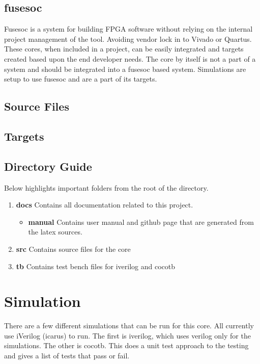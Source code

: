 \subsection{fusesoc}
\par
Fusesoc is a system for building FPGA software without relying on the internal project management of the tool. Avoiding vendor lock in to Vivado or Quartus.
These cores, when included in a project, can be easily integrated and targets created based upon the end developer needs. The core by itself is not a part of
a system and should be integrated into a fusesoc based system. Simulations are setup to use fusesoc and are a part of its targets.

\subsection{Source Files}



\subsection{Targets}



\subsection{Directory Guide}

\par
Below highlights important folders from the root of the directory.

\begin{enumerate}
  \item \textbf{docs} Contains all documentation related to this project.
    \begin{itemize}
      \item \textbf{manual} Contains user manual and github page that are generated from the latex sources.
    \end{itemize}
  \item \textbf{src} Contains source files for the core
  \item \textbf{tb} Contains test bench files for iverilog and cocotb
\end{enumerate}

\newpage

\section{Simulation}
\par
There are a few different simulations that can be run for this core. All currently use iVerilog (icarus) to run. The first is iverilog, which
uses verilog only for the simulations. The other is cocotb. This does a unit test approach to the testing and gives a list of tests that pass
or fail.

